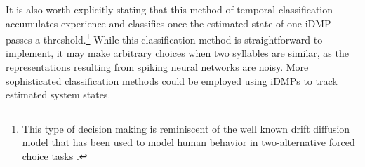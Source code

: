It is also worth explicitly stating
that this method of temporal classification
accumulates experience and classifies
once the estimated state of one iDMP
passes a threshold.\footnote{
  This type of decision making is reminiscent
  of the well known drift diffusion model
  that has been used to model
  human behavior in two-alternative forced choice tasks
  \cite{bogacz2006}.}
While this classification method
is straightforward to implement,
it may make arbitrary choices
when two syllables are similar,
as the representations resulting
from spiking neural networks are noisy.
More sophisticated classification methods
could be employed using
iDMPs to track estimated system states.

